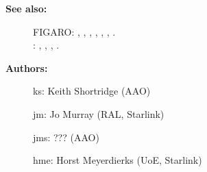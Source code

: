 \begin{description}
\item [{\bf See also:}]
FIGARO: , , , , , , .\\
: , , , .\\

\item [{\bf Authors:}]
 ks: Keith Shortridge (AAO)

 jm: Jo Murray (RAL, Starlink)

 jms: ??? (AAO)

 hme: Horst Meyerdierks (UoE, Starlink)
\end{description}
